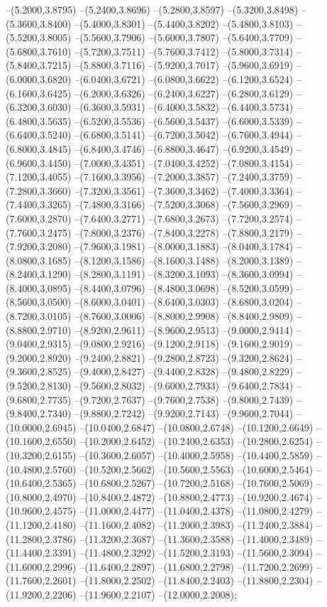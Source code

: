 {	--(5.2000,3.8795)
	--(5.2400,3.8696)
	--(5.2800,3.8597)
	--(5.3200,3.8498)
	--(5.3600,3.8400)
	--(5.4000,3.8301)
	--(5.4400,3.8202)
	--(5.4800,3.8103)
	--(5.5200,3.8005)
	--(5.5600,3.7906)
	--(5.6000,3.7807)
	--(5.6400,3.7709)
	--(5.6800,3.7610)
	--(5.7200,3.7511)
	--(5.7600,3.7412)
	--(5.8000,3.7314)
	--(5.8400,3.7215)
	--(5.8800,3.7116)
	--(5.9200,3.7017)
	--(5.9600,3.6919)
	--(6.0000,3.6820)
	--(6.0400,3.6721)
	--(6.0800,3.6622)
	--(6.1200,3.6524)
	--(6.1600,3.6425)
	--(6.2000,3.6326)
	--(6.2400,3.6227)
	--(6.2800,3.6129)
	--(6.3200,3.6030)
	--(6.3600,3.5931)
	--(6.4000,3.5832)
	--(6.4400,3.5734)
	--(6.4800,3.5635)
	--(6.5200,3.5536)
	--(6.5600,3.5437)
	--(6.6000,3.5339)
	--(6.6400,3.5240)
	--(6.6800,3.5141)
	--(6.7200,3.5042)
	--(6.7600,3.4944)
	--(6.8000,3.4845)
	--(6.8400,3.4746)
	--(6.8800,3.4647)
	--(6.9200,3.4549)
	--(6.9600,3.4450)
	--(7.0000,3.4351)
	--(7.0400,3.4252)
	--(7.0800,3.4154)
	--(7.1200,3.4055)
	--(7.1600,3.3956)
	--(7.2000,3.3857)
	--(7.2400,3.3759)
	--(7.2800,3.3660)
	--(7.3200,3.3561)
	--(7.3600,3.3462)
	--(7.4000,3.3364)
	--(7.4400,3.3265)
	--(7.4800,3.3166)
	--(7.5200,3.3068)
	--(7.5600,3.2969)
	--(7.6000,3.2870)
	--(7.6400,3.2771)
	--(7.6800,3.2673)
	--(7.7200,3.2574)
	--(7.7600,3.2475)
	--(7.8000,3.2376)
	--(7.8400,3.2278)
	--(7.8800,3.2179)
	--(7.9200,3.2080)
	--(7.9600,3.1981)
	--(8.0000,3.1883)
	--(8.0400,3.1784)
	--(8.0800,3.1685)
	--(8.1200,3.1586)
	--(8.1600,3.1488)
	--(8.2000,3.1389)
	--(8.2400,3.1290)
	--(8.2800,3.1191)
	--(8.3200,3.1093)
	--(8.3600,3.0994)
	--(8.4000,3.0895)
	--(8.4400,3.0796)
	--(8.4800,3.0698)
	--(8.5200,3.0599)
	--(8.5600,3.0500)
	--(8.6000,3.0401)
	--(8.6400,3.0303)
	--(8.6800,3.0204)
	--(8.7200,3.0105)
	--(8.7600,3.0006)
	--(8.8000,2.9908)
	--(8.8400,2.9809)
	--(8.8800,2.9710)
	--(8.9200,2.9611)
	--(8.9600,2.9513)
	--(9.0000,2.9414)
	--(9.0400,2.9315)
	--(9.0800,2.9216)
	--(9.1200,2.9118)
	--(9.1600,2.9019)
	--(9.2000,2.8920)
	--(9.2400,2.8821)
	--(9.2800,2.8723)
	--(9.3200,2.8624)
	--(9.3600,2.8525)
	--(9.4000,2.8427)
	--(9.4400,2.8328)
	--(9.4800,2.8229)
	--(9.5200,2.8130)
	--(9.5600,2.8032)
	--(9.6000,2.7933)
	--(9.6400,2.7834)
	--(9.6800,2.7735)
	--(9.7200,2.7637)
	--(9.7600,2.7538)
	--(9.8000,2.7439)
	--(9.8400,2.7340)
	--(9.8800,2.7242)
	--(9.9200,2.7143)
	--(9.9600,2.7044)
	--(10.0000,2.6945)
	--(10.0400,2.6847)
	--(10.0800,2.6748)
	--(10.1200,2.6649)
	--(10.1600,2.6550)
	--(10.2000,2.6452)
	--(10.2400,2.6353)
	--(10.2800,2.6254)
	--(10.3200,2.6155)
	--(10.3600,2.6057)
	--(10.4000,2.5958)
	--(10.4400,2.5859)
	--(10.4800,2.5760)
	--(10.5200,2.5662)
	--(10.5600,2.5563)
	--(10.6000,2.5464)
	--(10.6400,2.5365)
	--(10.6800,2.5267)
	--(10.7200,2.5168)
	--(10.7600,2.5069)
	--(10.8000,2.4970)
	--(10.8400,2.4872)
	--(10.8800,2.4773)
	--(10.9200,2.4674)
	--(10.9600,2.4575)
	--(11.0000,2.4477)
	--(11.0400,2.4378)
	--(11.0800,2.4279)
	--(11.1200,2.4180)
	--(11.1600,2.4082)
	--(11.2000,2.3983)
	--(11.2400,2.3884)
	--(11.2800,2.3786)
	--(11.3200,2.3687)
	--(11.3600,2.3588)
	--(11.4000,2.3489)
	--(11.4400,2.3391)
	--(11.4800,2.3292)
	--(11.5200,2.3193)
	--(11.5600,2.3094)
	--(11.6000,2.2996)
	--(11.6400,2.2897)
	--(11.6800,2.2798)
	--(11.7200,2.2699)
	--(11.7600,2.2601)
	--(11.8000,2.2502)
	--(11.8400,2.2403)
	--(11.8800,2.2304)
	--(11.9200,2.2206)
	--(11.9600,2.2107)
	--(12.0000,2.2008);
}
